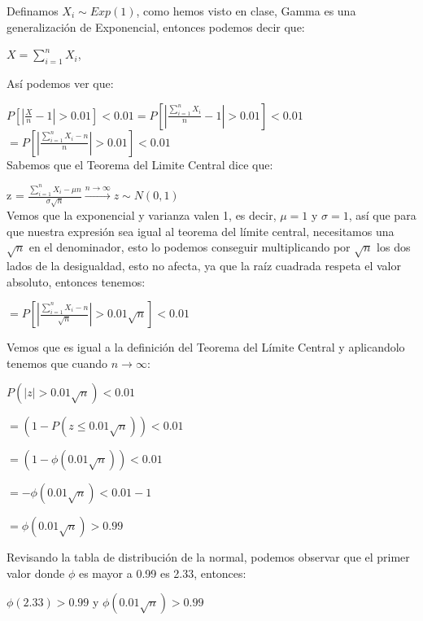 \documentclass[11pt,a4paper]{report}
\begin{document}
\begin{enumerate}
{          Definamos $X_{i} \sim Exp(1)$, como hemos visto en clase, Gamma es una generalización de Exponencial, entonces podemos decir que:
          
          $X = \sum_{i=1}^{n} X_{i}$,
          
          Así podemos ver que:
          
           $P[|\frac{X}{n}-1| > 0.01] < 0.01 = P[|\frac{\sum_{i=1}^{n} X_{i}}{n}-1| > 0.01] < 0.01$\\
           
           $= P[|\frac{\sum_{i=1}^{n} X_{i} -n}{n}| > 0.01] < 0.01$\\
           
           Sabemos que el Teorema del Limite Central dice que:
				
 				z = $\frac{\sum_{i=1}^{n} X_{i} - \mu n }{\sigma \sqrt{n}}  \xrightarrow{n \to \infty}  z \sim N(0,1)$\\
			            
          Vemos que la exponencial y varianza valen 1, es decir, $\mu = 1$ y $\sigma = 1$, así que para que nuestra expresión sea igual al teorema del límite central, necesitamos una $\sqrt{n}$ en el denominador, esto lo podemos conseguir multiplicando por $\sqrt{n}$ los dos lados de la desigualdad, esto no afecta, ya que la raíz cuadrada respeta el valor absoluto, entonces tenemos:
          
          $= P[|\frac{\sum_{i=1}^{n} X_{i} -n}{\sqrt{n}}| > 0.01\sqrt{n}] < 0.01$
          
          Vemos que es igual a la definición del Teorema del Límite Central y aplicandolo tenemos que cuando $n \to \infty$:
          
          $P( |z| > 0.01\sqrt{n} ) < 0.01$
          
          $ = (1 - P(z \leq 0.01\sqrt{n})) < 0.01$
          
          $ = (1 - \phi(0.01\sqrt{n})) < 0.01$
          
          $ = - \phi(0.01\sqrt{n}) < 0.01 - 1$
          
         $ = \phi(0.01\sqrt{n}) > 0.99$
          
        Revisando la tabla de distribución de la normal, podemos observar que el primer valor donde $\phi$ es mayor a 0.99 es 2.33, entonces:
        
        $\phi(2.33) > 0.99$  y  $\phi(0.01\sqrt{n}) > 0.99$\\
        
}
\end{enumerate}
\end{document}
